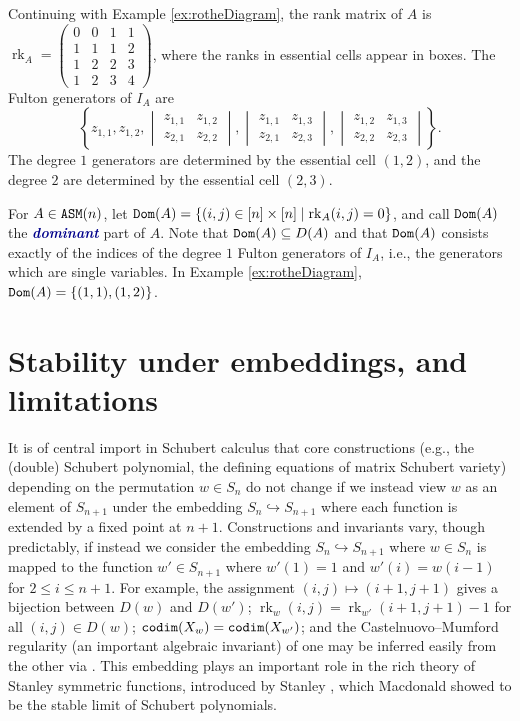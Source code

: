 \documentclass[12 pt]{amsart}
\DeclareMathOperator{\ASM}{{\tt ASM}}
\DeclareMathOperator{\codim}{{\tt codim}}
\DeclareMathOperator{\Dom}{{\tt Dom}}
\DeclareMathOperator{\rk}{rk}
\theoremstyle{plain}
\theoremstyle{definition}
\theoremstyle{remark}
\newcommand{\newword}[1]{\textcolor{darkblue}{\textbf{\emph{#1}}}}
\begin{document}
Continuing with Example \ref{ex:rotheDiagram}, the rank matrix of $A$ is  $\rk_A=\begin{pmatrix} 
    0 & \boxed{0} & 1 & 1\\
    1 & 1  & \boxed{1} & 2 \\
    1 & 2 & 2 & 3\\
    1 & 2 & 3 & 4
    \end{pmatrix}$, where the ranks in essential cells appear in boxes.  The Fulton generators of $I_A$ are \[
\left\{z_{1,1} , z_{1,2}, \begin{vmatrix} z_{1,1} & z_{1,2} \\
z_{2,1} & z_{2,2} \end{vmatrix}, \begin{vmatrix} z_{1,1} & z_{1,3} \\
z_{2,1} & z_{2,3} \end{vmatrix}, \begin{vmatrix} z_{1,2} & z_{1,3} \\
z_{2,2} & z_{2,3} \end{vmatrix}\right\}.
\] The degree $1$ generators are determined by the essential cell $(1,2)$, and the degree $2$ are determined by the essential cell $(2,3)$.

    For $A \in \ASM(n)$, let $\Dom(A) = \{(i,j) \in [n] \times [n] \mid \rk_A(i,j) = 0\}$, and call $\Dom(A)$ the \newword{dominant} part of $A$.  Note that $\Dom(A) \subseteq D(A)$ and that $\Dom(A)$ consists exactly of the indices of the degree $1$ Fulton generators of $I_A$, i.e., the generators which are single variables.  In Example \ref{ex:rotheDiagram}, $\Dom(A) = \{(1,1),(1,2)\}$.  





\section{Stability under embeddings, and limitations}
It is of central import in Schubert calculus that core constructions (e.g., the (double) Schubert polynomial, the defining equations of matrix Schubert variety) depending on the permutation $w \in S_n$ do not change if we instead view $w$ as an element of $S_{n+1}$ under the embedding $S_n \hookrightarrow S_{n+1}$ where each function is extended by a fixed point at $n+1$.  Constructions and invariants vary, though predictably, if instead we consider the embedding $S_n \hookrightarrow S_{n+1}$ where $w \in S_n$ is mapped to the function $w' \in S_{n+1}$ where $w'(1) = 1$ and $w'(i) = w(i-1)$ for $2 \leq i \leq n+1$.   For example, the assignment $(i,j) \mapsto (i+1,j+1)$ gives a bijection between $D(w)$ and $D(w')$; $\rk_w(i,j) = \rk_{w'}(i+1,j+1)-1$ for all $(i,j) \in D(w)$; $\codim(X_w) = \codim(X_{w'})$; and the Castelnuovo–Mumford regularity (an important algebraic invariant) of one may be inferred easily from the other via \cite{PSW24}.  This embedding plays an important role in the rich theory of Stanley symmetric functions, introduced by Stanley \cite{Sta84}, which Macdonald \cite{Mac91} showed to be the stable limit of Schubert polynomials.   
\end{document}
